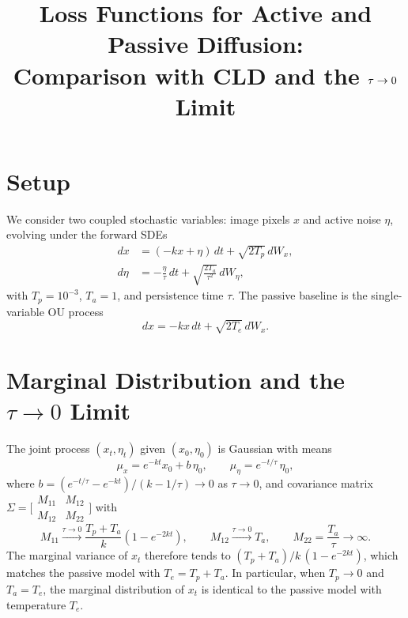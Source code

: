 \documentclass[11pt]{article}
\title{Loss Functions for Active and Passive Diffusion:\\
Comparison with CLD and the $\tauu\to 0$ Limit}
\author{}
\date{}
\newcommand{\Tp}{T_p}
\newcommand{\Ta}{T_a}
\newcommand{\Te}{T_e}
\newcommand{\kk}{k}
\newcommand{\tauu}{\tau}
\begin{document}
\maketitle

\section{Setup}

We consider two coupled stochastic variables: image pixels $x$ and active noise $\eta$,
evolving under the forward SDEs
\begin{align}
dx &= (-\kk x + \eta)\,dt + \sqrt{2\Tp}\,dW_x, \label{eq:sde_x}\\
d\eta &= -\frac{\eta}{\tauu}\,dt + \sqrt{\frac{2\Ta}{\tauu^2}}\,dW_\eta, \label{eq:sde_eta}
\end{align}
with $\Tp = 10^{-3}$, $\Ta = 1$, and persistence time $\tauu$.
The passive baseline is the single-variable OU process
\begin{equation}
dx = -\kk x\,dt + \sqrt{2\Te}\,dW_x.
\end{equation}

\section{Marginal Distribution and the $\tauu\to 0$ Limit}

The joint process $(x_t, \eta_t)$ given $(x_0, \eta_0)$ is Gaussian with means
\begin{equation}
\mu_x = e^{-\kk t} x_0 + b\,\eta_0, \qquad
\mu_\eta = e^{-t/\tauu}\,\eta_0,
\end{equation}
where $b = (e^{-t/\tauu} - e^{-\kk t})/(\kk - 1/\tauu) \to 0$ as $\tauu\to 0$,
and covariance matrix $\Sigma = \bigl[\begin{smallmatrix} M_{11} & M_{12} \\ M_{12} & M_{22} \end{smallmatrix}\bigr]$ with
\begin{equation}
M_{11} \xrightarrow{\tauu\to 0} \frac{\Tp + \Ta}{\kk}(1 - e^{-2\kk t}), \qquad
M_{12} \xrightarrow{\tauu\to 0} \Ta, \qquad
M_{22} = \frac{\Ta}{\tauu} \to \infty.
\end{equation}
The marginal variance of $x_t$ therefore tends to $(\Tp+\Ta)/\kk\,(1-e^{-2\kk t})$,
which matches the passive model with $\Te = \Tp + \Ta$.
In particular, when $\Tp\to 0$ and $\Ta = \Te$, the marginal distribution of $x_t$ is
identical to the passive model with temperature $\Te$.
\end{document}
